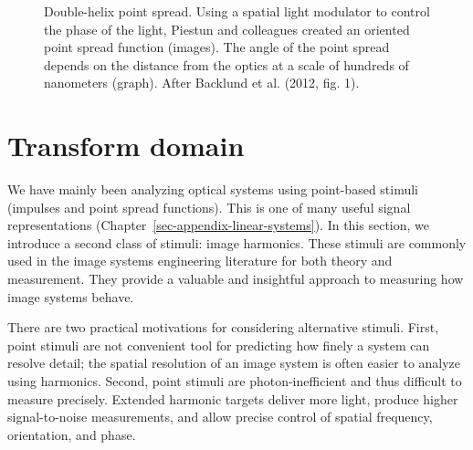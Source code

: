 \documentclass[
  letterpaper,
]{book}
\begin{document}
\begin{figure}


\caption{\label{fig-optics-double-helix}Double-helix point spread. Using
a spatial light modulator to control the phase of the light, Piestun and
colleagues created an oriented point spread function (images). The angle
of the point spread depends on the distance from the optics at a scale
of hundreds of nanometers (graph). After Backlund et al. (2012, fig.
1).}

\end{figure}%

\chapter{Transform domain}\label{sec-optics-linear-harmonics}

We have mainly been analyzing optical systems using point-based stimuli
(impulses and point spread functions). This is one of many useful signal
representations (Chapter~\ref{sec-appendix-linear-systems}). In this
section, we introduce a second class of stimuli: image harmonics. These
stimuli are commonly used in the image systems engineering literature
for both theory and measurement. They provide a valuable and insightful
approach to measuring how image systems behave.

There are two practical motivations for considering alternative stimuli.
First, point stimuli are not convenient tool for predicting how finely a
system can resolve detail; the spatial resolution of an image system is
often easier to analyze using harmonics. Second, point stimuli are
photon-inefficient and thus difficult to measure precisely. Extended
harmonic targets deliver more light, produce higher signal-to-noise
measurements, and allow precise control of spatial frequency,
orientation, and phase.
\end{document}
